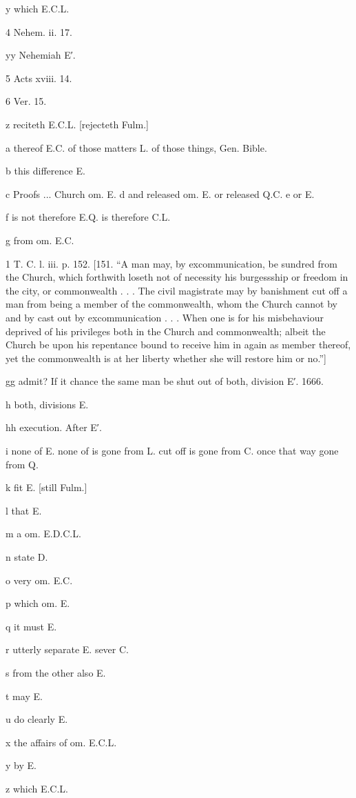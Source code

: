 y
which E.C.L.

4
Nehem. ii. 17.

yy
Nehemiah E′.

5
Acts xviii. 14.

6
Ver. 15.

z
reciteth E.C.L. [rejecteth Fulm.]

a
thereof E.C. of those matters L. of those things, Gen. Bible.

b
this difference E.

c Proofs ... Church om. E.
d and released om. E. or released Q.C.
e
or E.

f
is not therefore E.Q. is therefore C.L.

g
from om. E.C.

1
T. C. l. iii. p. 152. [151. “A man may, by excommunication, be sundred from the Church, which forthwith loseth not of necessity his burgessship or freedom in the city, or commonwealth . . . The civil magistrate may by banishment cut off a man from being a member of the commonwealth, whom the Church cannot by and by cast out by excommunication . . . When one is for his misbehaviour deprived of his privileges both in the Church and commonwealth; albeit the Church be upon his repentance bound to receive him in again as member thereof, yet the commonwealth is at her liberty whether she will restore him or no.”]

gg
admit? If it chance the same man be shut out of both, division E′. 1666.

h
both, divisions E.

hh
execution. After E′.

i
none of E. none of is gone from L. cut off is gone from C. once that way gone from Q.

k
fit E. [still Fulm.]

l
that E.

m
a om. E.D.C.L.

n
state D.

o
very om. E.C.

p
which om. E.

q
it must E.

r
utterly separate E. sever C.

s
from the other also E.

t
may E.

u
do clearly E.

x
the affairs of om. E.C.L.

y
by E.

z
which E.C.L.

